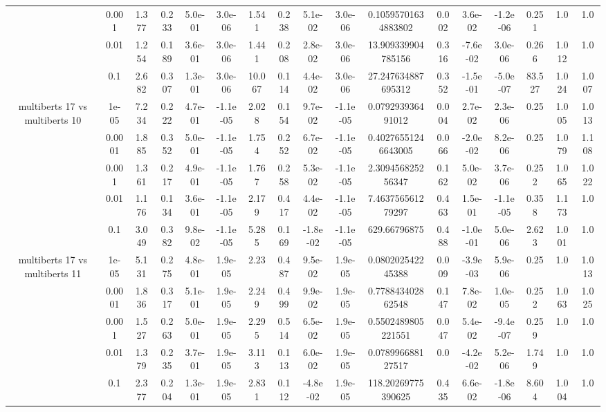 \begin{tabular}{|c|c|c|c|c|c|c|c|c|c|c|c|c|c|c|c|c|}
 & 0.001 & 1.377 & 0.233 & 5.0e-01 & 3.0e-06 & 1.541 & 0.238 & 5.1e-02 & 3.0e-06 & 0.10595701634883802 & 0.002 & 3.6e-02 & -1.2e-06 & 0.251 & 1.0 & 1.0 \\
 & 0.01 & 1.254 & 0.189 & 3.6e-01 & 3.0e-06 & 1.441 & 0.208 & 2.8e-02 & 3.0e-06 & 13.909339904785156 & 0.316 & -7.6e-02 & 3.0e-06 & 0.266 & 1.012 & 1.0 \\
 & 0.1 & 2.682 & 0.307 & 1.3e-01 & 3.0e-06 & 10.067 & 0.114 & 4.4e-02 & 3.0e-06 & 27.247634887695312 & 0.352 & -1.5e-01 & -5.0e-07 & 83.527 & 1.024 & 1.007 \\
\hline
\multirow{5}{*}{multiberts 17 vs multiberts 10} & 1e-05 & 7.234 & 0.222 & 4.7e-01 & -1.1e-05 & 2.028 & 0.154 & 9.7e-02 & -1.1e-05 & 0.079293936491012 & 0.004 & 2.7e-02 & 2.3e-06 & 0.25 & 1.005 & 1.013 \\
 & 0.0001 & 1.885 & 0.352 & 5.0e-01 & -1.1e-05 & 1.754 & 0.252 & 6.7e-02 & -1.1e-05 & 0.40276551246643005 & 0.066 & -2.0e-02 & 8.2e-06 & 0.25 & 1.079 & 1.108 \\
 & 0.001 & 1.361 & 0.217 & 4.9e-01 & -1.1e-05 & 1.767 & 0.258 & 5.3e-02 & -1.1e-05 & 2.309456825256347 & 0.162 & 5.0e-02 & 3.7e-06 & 0.252 & 1.065 & 1.022 \\
 & 0.01 & 1.176 & 0.134 & 3.6e-01 & -1.1e-05 & 2.179 & 0.417 & 4.4e-02 & -1.1e-05 & 7.463756561279297 & 0.463 & 1.5e-01 & -1.1e-05 & 0.358 & 1.173 & 1.0 \\
 & 0.1 & 3.049 & 0.382 & 9.8e-02 & -1.1e-05 & 5.285 & 0.169 & -1.8e-02 & -1.1e-05 & 629.66796875 & 0.488 & -1.0e-01 & 5.0e-06 & 2.623 & 1.001 & 1.0 \\
\hline
\multirow{5}{*}{multiberts 17 vs multiberts 11} & 1e-05 & 5.131 & 0.275 & 4.8e-01 & 1.9e-05 & 2.23 & 0.487 & 9.5e-02 & 1.9e-05 & 0.080202542245388 & 0.009 & -3.9e-03 & 5.9e-06 & 0.25 & 1.0 & 1.013 \\
 & 0.0001 & 1.836 & 0.317 & 5.1e-01 & 1.9e-05 & 2.249 & 0.499 & 9.9e-02 & 1.9e-05 & 0.778843402862548 & 0.147 & 7.8e-02 & 1.0e-05 & 0.252 & 1.063 & 1.025 \\
 & 0.001 & 1.527 & 0.263 & 5.0e-01 & 1.9e-05 & 2.295 & 0.514 & 6.5e-02 & 1.9e-05 & 0.5502489805221551 & 0.047 & 5.4e-02 & -9.4e-07 & 0.259 & 1.0 & 1.0 \\
 & 0.01 & 1.379 & 0.235 & 3.7e-01 & 1.9e-05 & 3.113 & 0.113 & 6.0e-02 & 1.9e-05 & 0.078996688127517 & 0.0 & -4.2e-02 & 5.2e-06 & 1.749 & 1.0 & 1.0 \\
 & 0.1 & 2.377 & 0.204 & 1.3e-01 & 1.9e-05 & 2.831 & 0.112 & -4.8e-02 & 1.9e-05 & 118.20269775390625 & 0.435 & 6.6e-02 & -1.8e-06 & 8.604 & 1.004 & 1.0 \\

\end{tabular}
